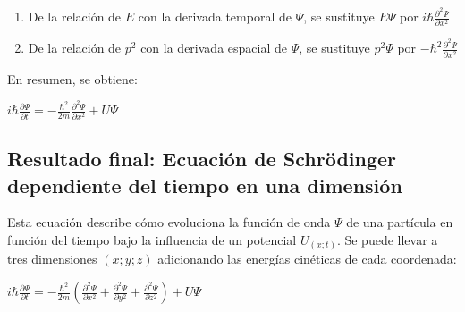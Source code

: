 \documentclass[a4paper]{article}
\begin{document}
            \begin{enumerate}
                \item De la relación de $E$ con la derivada temporal de $\Psi$, se sustituye $E \Psi$ por $i \hbar \frac{\partial ^2 \Psi}{\partial x^2}$
                \item De la relación de $p^2$ con la derivada espacial de $\Psi$, se sustituye $p^2 \Psi$ por $- \hbar ^2 \frac{\partial ^2 \Psi}{\partial x^2}$
            \end{enumerate}

            En resumen, se obtiene: 

            \begin{center}
                $i \hbar \frac{\partial \Psi}{\partial t} = -\frac{\hbar ^2}{2m} \frac{\partial^2 \Psi}{\partial x^2} + U \Psi$
            \end{center}

        \subsection{Resultado final: Ecuación de Schrödinger dependiente del tiempo en una dimensión}

            \indent Esta ecuación describe cómo evoluciona la función de onda $\Psi$ de una partícula en función del tiempo bajo la influencia de un potencial $U_{(x;t)}$. Se puede llevar a tres dimensiones $(x;y;z)$ adicionando las energías cinéticas de cada coordenada:

            \begin{center}
                $i \hbar \frac{\partial \Psi}{\partial t} = -\frac{\hbar ^2}{2m} (\frac{\partial^2 \Psi}{\partial x^2} + \frac{\partial^2 \Psi}{\partial y^2} + \frac{\partial ^2 \Psi}{\partial z^2}) + U \Psi$
                
            \end{center}
\end{document}

